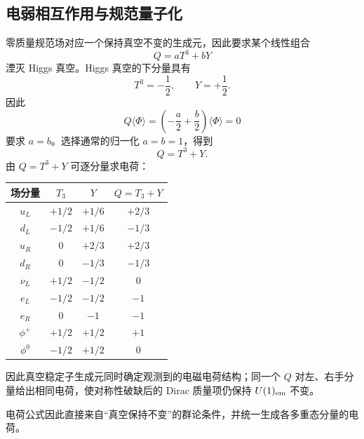 \subsection{电弱相互作用与规范量子化}

\begin{proposition}[电荷生成元来自真空稳定子]
零质量规范场对应一个保持真空不变的生成元，因此要求某个线性组合
\begin{equation*}
 Q=aT^3+bY
\end{equation*}
湮灭 Higgs 真空。Higgs 真空的下分量具有
\begin{equation*}
 T^3=-\frac12,
 \qquad Y=+\frac12.
\end{equation*}
因此
\begin{equation*}
 Q\langle\Phi\rangle
 =\left(-\frac a2+\frac b2\right)\langle\Phi\rangle=0
\end{equation*}
要求 $a=b$。选择通常的归一化 $a=b=1$，得到
\begin{equation}
 \boxed{Q=T^3+Y.}
 \label{eq:gm-nishijima-sm-dp11}
\end{equation}
由 $Q=T^3+Y$ 可逐分量求电荷：
\begin{center}
\begin{tabular}{c|c|c|c}
场分量 & $T_3$ & $Y$ & $Q=T_3+Y$\\
\hline
$u_L$ & $+1/2$ & $+1/6$ & $+2/3$\\
$d_L$ & $-1/2$ & $+1/6$ & $-1/3$\\
$u_R$ & $0$ & $+2/3$ & $+2/3$\\
$d_R$ & $0$ & $-1/3$ & $-1/3$\\
$\nu_L$ & $+1/2$ & $-1/2$ & $0$\\
$e_L$ & $-1/2$ & $-1/2$ & $-1$\\
$e_R$ & $0$ & $-1$ & $-1$\\
$\phi^+$ & $+1/2$ & $+1/2$ & $+1$\\
$\phi^0$ & $-1/2$ & $+1/2$ & $0$
\end{tabular}
\end{center}
因此真空稳定子生成元同时确定观测到的电磁电荷结构；同一个 $Q$ 对左、右手分量给出相同电荷，使对称性破缺后的 Dirac 质量项仍保持 $U(1)_{\rm em}$ 不变。

电荷公式因此直接来自“真空保持不变”的群论条件，并统一生成各多重态分量的电荷。
\end{proposition}

